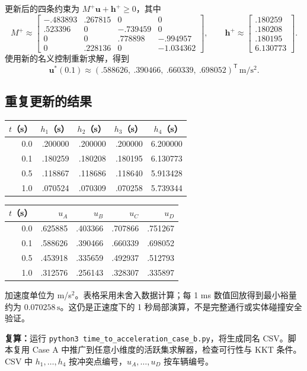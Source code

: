\documentclass[UTF8,fontset=fandol,11pt,a4paper]{ctexart}
\newcommand{\unit}[1]{\,\mathrm{#1}}
\begin{document}
更新后的四条约束为 $M^+\mathbf u+\mathbf h^+\geq0$，其中
\[
M^+\approx\begin{bmatrix}
-.483893&.267815&0&0\\
.523396&0&-.739459&0\\
0&0&.778898&-.994957\\
0&.228136&0&-1.034362
\end{bmatrix},\qquad
\mathbf h^+\approx\begin{bmatrix}.180259\\.180208\\.180195\\6.130773\end{bmatrix}.
\]
使用新的名义控制重新求解，得到
\[
\boxed{\mathbf u^*(0.1)\approx(.588626,\ .390466,\ .660339,\ .698052)^{\mathsf T}\unit{m/s^2}.}
\]
\subsection{重复更新的结果}
\begin{center}\small
\begin{tabular}{rrrrr}
\toprule
$t$（s） & $h_1$（s） & $h_2$（s） & $h_3$（s） & $h_4$（s）\\\midrule
0.0&.200000&.200000&.200000&6.200000\\
0.1&.180259&.180208&.180195&6.130773\\
0.5&.118867&.118686&.118640&5.913428\\
1.0&.070524&.070309&.070258&5.739344\\\bottomrule
\end{tabular}\quad
\begin{tabular}{rrrrr}
\toprule
$t$（s）&$u_A$&$u_B$&$u_C$&$u_D$\\\midrule
0.0&.625885&.403366&.707866&.751267\\
0.1&.588626&.390466&.660339&.698052\\
0.5&.453918&.335659&.492937&.512793\\
1.0&.312576&.256143&.328307&.335897\\\bottomrule
\end{tabular}
\end{center}
加速度单位为 m/s$^2$。表格采用未舍入数据计算；每 1 ms 数值回放得到最小裕量约为 $0.070258\unit{s}$。这仍是正速度下的 1 秒局部演算，不是完整通行或实体碰撞安全验证。

\textbf{复算：}运行 \texttt{python3 time\_to\_acceleration\_case\_b.py}，将生成同名 CSV。脚本复用 Case A 中推广到任意小维度的活跃集求解器，检查可行性与 KKT 条件。CSV 中 $h_1,\ldots,h_4$ 按冲突点编号，$u_A,\ldots,u_D$ 按车辆编号。
\end{document}
